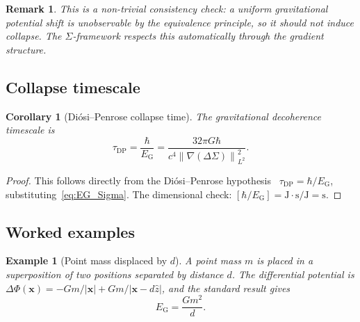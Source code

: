 \documentclass[letterpaper,twocolumn,superscriptaddress,longbibliography]{revtex4-2}
\newtheorem{corollary}[theorem]{Corollary}
\newtheorem*{remark}{Remark}
\newtheorem{example}{Example}[section]
\newcommand{\norm}[1]{\left\|#1\right\|}
\newcommand{\EG}{E_{\mathrm{G}}}
\newcommand{\DSigma}{\Delta\Sigma}
\newcommand{\DPhi}{\Delta\Phi}
\begin{document}
\begin{remark}
This is a non-trivial consistency check: a uniform gravitational
potential shift is unobservable by the equivalence principle,
so it should not induce collapse.
The $\Sigma$-framework respects this automatically through the
gradient structure.
\end{remark}

\subsection{Collapse timescale}

\begin{corollary}[Di\'{o}si--Penrose collapse time]
\label{cor:collapse_time}
The gravitational decoherence timescale is
\begin{equation}
  \tau_{\mathrm{DP}}
  = \frac{\hbar}{\EG}
  = \frac{32\pi G\hbar}{c^4 \norm{\nabla(\DSigma)}^2_{L^2}}.
  \label{eq:tau_DP}
\end{equation}
\end{corollary}

\begin{proof}
This follows directly from the Di\'{o}si--Penrose
hypothesis~\cite{Diosi1987,Penrose1996}
$\tau_{\mathrm{DP}} = \hbar/\EG$, substituting~\eqref{eq:EG_Sigma}.
The dimensional check:
$[\hbar/\EG] = \mathrm{J \cdot s / J} = \mathrm{s}$.
\end{proof}

\subsection{Worked examples}

\begin{example}[Point mass displaced by $d$]
\label{ex:point_mass}
A point mass $m$ is placed in a superposition of two positions
separated by distance $d$.
The differential potential is
$\DPhi(\bm{x}) = -Gm/|\bm{x}| + Gm/|\bm{x}-d\hat{z}|$,
and the standard result gives~\cite{Penrose1996}
\begin{equation}
  \EG = \frac{Gm^2}{d}.
  \label{eq:EG_point}
\end{equation}
\end{example}
\end{document}
